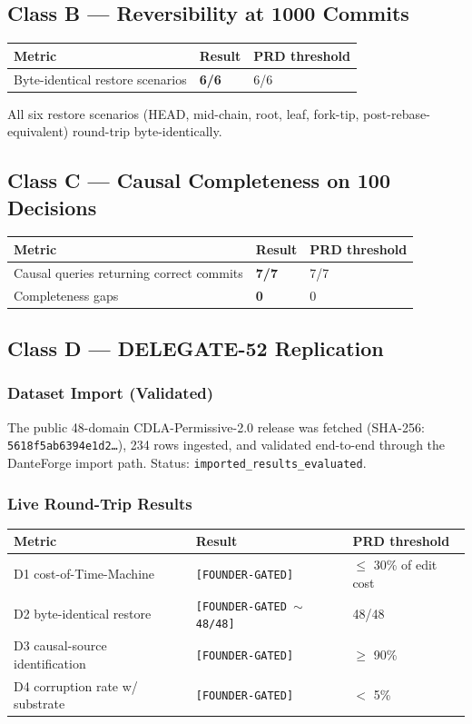 \documentclass[11pt]{article}
\begin{document}
\subsection{Class B --- Reversibility at 1000 Commits}

\begin{tabular}{lll}
\toprule
Metric & Result & PRD threshold \\
\midrule
Byte-identical restore scenarios & \textbf{6/6} & 6/6 \\
\bottomrule
\end{tabular}

All six restore scenarios (HEAD, mid-chain, root, leaf, fork-tip, post-rebase-equivalent) round-trip byte-identically.

\subsection{Class C --- Causal Completeness on 100 Decisions}

\begin{tabular}{lll}
\toprule
Metric & Result & PRD threshold \\
\midrule
Causal queries returning correct commits & \textbf{7/7} & 7/7 \\
Completeness gaps & \textbf{0} & 0 \\
\bottomrule
\end{tabular}

\subsection{Class D --- DELEGATE-52 Replication}

\subsubsection{Dataset Import (Validated)}

The public 48-domain CDLA-Permissive-2.0 release was fetched (SHA-256: \texttt{5618f5ab6394e1d2\ldots}), 234 rows ingested, and validated end-to-end through the DanteForge import path. Status: \texttt{imported\_results\_evaluated}.

\subsubsection{Live Round-Trip Results}

\begin{tabular}{lll}
\toprule
Metric & Result & PRD threshold \\
\midrule
D1 cost-of-Time-Machine & \texttt{[FOUNDER-GATED]} & $\leq$ 30\% of edit cost \\
D2 byte-identical restore & \texttt{[FOUNDER-GATED $\sim$ 48/48]} & 48/48 \\
D3 causal-source identification & \texttt{[FOUNDER-GATED]} & $\geq$ 90\% \\
D4 corruption rate w/ substrate & \texttt{[FOUNDER-GATED]} & $<$ 5\% \\
\bottomrule
\end{tabular}
\end{document}
